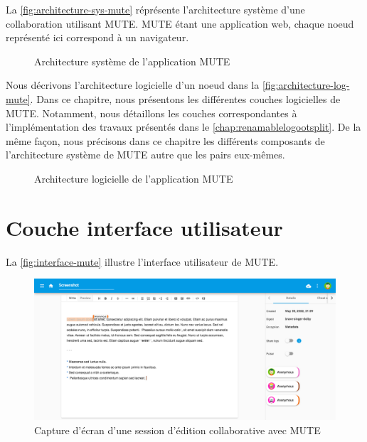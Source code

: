 \documentclass[12pt]{thesul}
\begin{document}
La \autoref{fig:architecture-sys-mute} réprésente l'architecture système d'une collaboration utilisant MUTE.
MUTE étant une application web, chaque noeud représenté ici correspond à un navigateur.

\begin{figure}[!ht]
  \caption{Architecture système de l'application MUTE}
  \label{fig:architecture-sys-mute}
\end{figure}

Nous décrivons l'architecture logicielle d'un noeud dans la \autoref{fig:architecture-log-mute}.
Dans ce chapitre, nous présentons les différentes couches logicielles de MUTE.
Notamment, nous détaillons les couches correspondantes à l'implémentation des travaux présentés dans le \autoref{chap:renamablelogootsplit}.
De la même façon, nous précisons dans ce chapitre les différents composants de l'architecture système de MUTE autre que les pairs eux-mêmes.

\begin{figure}[!ht]
  \caption{Architecture logicielle de l'application MUTE}
  \label{fig:architecture-log-mute}
\end{figure}

\section{Couche interface utilisateur}

La \autoref{fig:interface-mute} illustre l'interface utilisateur de MUTE.

\begin{figure}[!ht]
  \centering
  \includegraphics[width=\linewidth]{img/screenshot-mute.png}
  \caption{Capture d'écran d'une session d'édition collaborative avec MUTE}
  \label{fig:interface-mute}
\end{figure}
\end{document}

